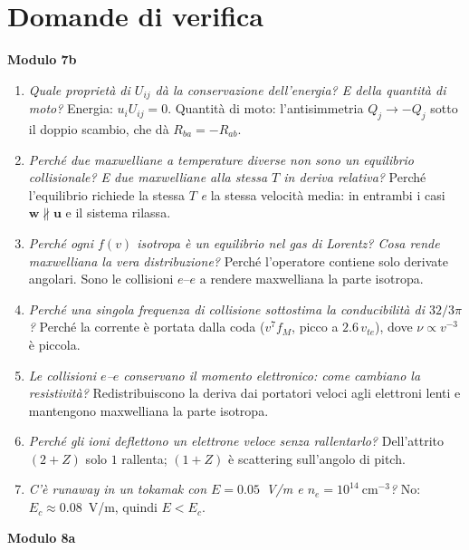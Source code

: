 \section{Domande di verifica}
\textbf{Modulo 7b}
\begin{enumerate}
\item \textit{Quale proprietà di $U_{ij}$ dà la conservazione dell'energia? E della quantità di moto?} Energia: $u_iU_{ij}=0$. Quantità di moto: l'antisimmetria $Q_j\to-Q_j$ sotto il doppio scambio, che dà $R_{ba}=-R_{ab}$.
\item \textit{Perché due maxwelliane a temperature diverse non sono un equilibrio collisionale? E due maxwelliane alla stessa $T$ in deriva relativa?} Perché l'equilibrio richiede la stessa $T$ \emph{e} la stessa velocità media: in entrambi i casi $\mathbf{w}\not\parallel\mathbf{u}$ e il sistema rilassa.
\item \textit{Perché ogni $f(v)$ isotropa è un equilibrio nel gas di Lorentz? Cosa rende maxwelliana la vera distribuzione?} Perché l'operatore contiene solo derivate angolari. Sono le collisioni $e$--$e$ a rendere maxwelliana la parte isotropa.
\item \textit{Perché una singola frequenza di collisione sottostima la conducibilità di $32/3\pi$?} Perché la corrente è portata dalla coda ($v^7f_M$, picco a $2.6\,v_{te}$), dove $\nu\propto v^{-3}$ è piccola.
\item \textit{Le collisioni $e$--$e$ conservano il momento elettronico: come cambiano la resistività?} Redistribuiscono la deriva dai portatori veloci agli elettroni lenti e mantengono maxwelliana la parte isotropa.
\item \textit{Perché gli ioni deflettono un elettrone veloce senza rallentarlo?} Dell'attrito $(2+Z)$ solo $1$ rallenta; $(1+Z)$ è scattering sull'angolo di pitch.
\item \textit{C'è runaway in un tokamak con $E=0.05$~V/m e $n_e=10^{14}~\mathrm{cm^{-3}}$?} No: $E_c\approx0.08$~V/m, quindi $E<E_c$.
\end{enumerate}
\textbf{Modulo 8a}
